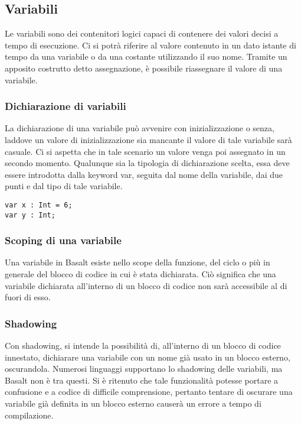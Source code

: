 \subsection{Variabili}
Le variabili sono dei contenitori logici capaci di contenere dei valori decisi a tempo di esecuzione. Ci si potrà riferire 
al valore contenuto in un dato istante di tempo da una variabile o da una costante utilizzando il suo nome. Tramite un apposito 
costrutto detto assegnazione, è possibile riassegnare il valore di una variabile.

\subsubsection{Dichiarazione di variabili}
La dichiarazione di una variabile può avvenire con inizializzazione o senza, laddove un valore di inizializzazione sia mancante il valore 
di tale variabile sarà casuale. Ci si aspetta che in tale scenario un valore venga poi assegnato in un secondo momento. Qualunque sia la 
tipologia di dichiarazione scelta, essa deve essere introdotta dalla keyword var, seguita dal nome della variabile, dai due punti e dal tipo 
di tale variabile.

\vspace{0.5cm}

\begin{lstlisting}[frame=single]
var x : Int = 6;
var y : Int;
\end{lstlisting}

\subsubsection{Scoping di una variabile}
Una variabile in Basalt esiste nello scope della funzione, del ciclo o più in generale del blocco di codice in cui è stata dichiarata. Ciò 
significa che una variabile dichiarata all’interno di un blocco di codice non sarà accessibile al di fuori di esso.

\subsubsection{Shadowing}
Con shadowing, si intende la possibilità di, all'interno di un blocco di codice innestato, dichiarare una variabile con un nome già usato
in un blocco esterno, oscurandola. Numerosi linguaggi supportano lo shadowing delle variabili, ma Basalt non è tra questi. Si è ritenuto 
che tale funzionalità potesse portare a confusione e a codice di difficile comprensione, pertanto tentare di oscurare una variabile già definita
in un blocco esterno causerà un errore a tempo di compilazione.

